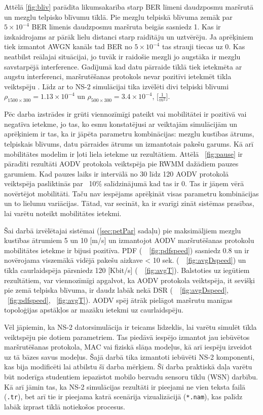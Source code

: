 Attēlā \ref{fig:bliv} parādīta likumsakarība starp BER līmeni daudzposmu maršrutā un mezglu telpisko blīvumu tīklā. Pie mezglu telpiskā blīvuma zemāk par $5\times10^{-4}$ BER līmenis daudzposmu maršruta beigās sasniedz 1. Kas ir izskaidrojams ar pārāk lielu distanci starp raidītāju un uztvērēju. Ja aprēķiniem tiek izmantot AWGN kanāls tad BER no $5\times10^{-4}$ tas strauji tiecas uz 0. Kas neatbilst reālajai situācijai, jo tuvāk ir raidošie mezgli jo augstāka ir mezglu savstarpējā interference. Gadījumā kad datu pārraide tīklā tiek ietekmēta ar augstu interferenci, maršrutēšanas protokols nevar pozitīvi ietekmēt tīkla veiktspēju \cite{qoS_mobility}. Līdz ar to NS-2 simulācijai tika izvēlēti divi telpiski blīvumi $\rho_{1500\times300} = 1.13\times10^{-4}$ un $\rho_{500\times300} = 3.4\times10^{-4}$, [$\frac{1}{m^{2}}$].

Pēc darba izstrādes ir grūti viennozīmīgi pateikt vai mobilitātei ir pozitīvā vai negatīva ietekme, jo tas, ko esmu konstatējusi ar veiktajām simulācijām un aprēķiniem  ir tas, ka ir jāpēta parametru kombinācijas: mezglu kustības ātrums, telpiskais blīvums, datu pārraides ātrums un izmantotais pakešu garums. Kā arī mobilitātes modelim ir ļoti liela ietekme uz rezultātiem. Attēlā ~\ref{fig:pause} ir pāradīti rezultāti AODV protokola veiktspēja pie RWMM dažādiem pauzes garumiem. Kad pauzes laiks ir intervālā no 30 līdz 120 AODV protokolā veiktspēja pasliktinās par ~10\% salīdzinājumā kad tas ir 0. Tas ir jāņem vērā novērtējot mobilitāti. Taču nav iespējams aprēķināt visas parametru kombinācijas un to lielumu variācijas. Tātad, var secināt, ka ir svarīgi zināt sistēmas prasības, lai varētu noteikt mobilitātes ietekmi.

Šai darbā izvēlētajai sistēmai (\seename \ref{sec:petPar} sadaļu) pie maksimāljiem mezglu kustības ātrumiem 5 un 10 [m/s] un izmantojot AODV maršrutēšanas protokolu mobilitātes ietekme ir bijusi pozitīva. \acf{PDF} (\seename ~\figurename~\ref{fig:pdfspeed}) sasniedz 0.8 un ir novērojama viszemākā vidējā pakešu aizkave < 10 sek. (\seename ~\figurename ~\ref{fig:avgDspeed}) un tīkla caurlaidspēja pārsniedz 120 [Kbit/s] (\seename ~\figurename ~\ref{fig:avgT}). Balstoties uz iegūtiem rezultātiem, var viennozīmīgi apgalvot, ka AODV protokola veiktspēja, it sevišķi pie zemā telpiska blīvuma, ir daudz labāk nekā DSR (\seename ~\figurename ~\ref{fig:avgDspeed}, ~\ref{fig:pdfspeed}, ~\ref{fig:avgT}). AODV spēj ātrāk pielāgot maršrutu manīgas topoloģijas apstākļos ar mazāku ietekmi uz caurlaidspēju.

Vēl jāpiemin, ka NS-2 datorsimulācija ir teicams līdzeklis, lai varētu simulēt tīkla veiktspēju pie dotiem parametriem. Tas piedāvā iespējo izmantot jau iebūvētos maršrutēšanas protokola, MAC vai fiziskā slāņa modeļus, kā arī iespēju izveidot uz tā bāzes savus modeļus. Šajā darbā tika izmantoti iebūvēti NS-2 komponenti, kas bija modificēti lai atbilstu šī darba mērķiem. Šī darba praktiskā daļa varētu būt noderīga studentiem iepazīstot mobilo bezvadu sensoru tīklu (WSN) darbību. Kā arī jāmin tas, ka NS-2 simulācijas rezultāti ir pieejami ne vien teksta failā (\texttt{.tr}), bet arī tie ir pieejama katrā scenārija vizualizācijā (\texttt{*.nam}), kas palīdz labāk izprast tīklā notiekošos procesus.

